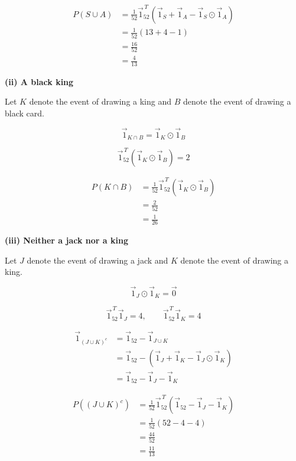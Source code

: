 \begin{enumerate}[label=\thesubsection.\arabic*, ref=\thesubsection.\theenumi]
\[
\begin{aligned}
P(S\cup A)
&=\frac{1}{52}\vec{1}_{52}^{\,T}
\left(
\vec{1}_S+\vec{1}_A-
\vec{1}_S\odot\vec{1}_A
\right)\\[6pt]
&=\frac{1}{52}(13+4-1)\\
&=\frac{16}{52}\\
&=\frac{4}{13}
\end{aligned}
\]

\par
\medskip
\noindent\textbf{(ii) A black king}
\par
\smallskip

Let $K$ denote the event of drawing a king and
$B$ denote the event of drawing a black card.

\[
\vec{1}_{K\cap B}
=
\vec{1}_K\odot\vec{1}_B
\]

\[
\vec{1}_{52}^{\,T}
(\vec{1}_K\odot\vec{1}_B)=2
\]

\[
\begin{aligned}
P(K\cap B)
&=\frac{1}{52}\vec{1}_{52}^{\,T}
(\vec{1}_K\odot\vec{1}_B)\\[6pt]
&=\frac{2}{52}\\
&=\frac{1}{26}
\end{aligned}
\]

\par
\medskip
\noindent\textbf{(iii) Neither a jack nor a king}
\par
\smallskip

Let $J$ denote the event of drawing a jack and
$K$ denote the event of drawing a king.

\[
\vec{1}_J\odot\vec{1}_K=\vec{0}
\]

\[
\vec{1}_{52}^{\,T}\vec{1}_J=4,
\qquad
\vec{1}_{52}^{\,T}\vec{1}_K=4
\]

\[
\begin{aligned}
\vec{1}_{(J\cup K)^c}
&=\vec{1}_{52}-\vec{1}_{J\cup K}\\
&=\vec{1}_{52}-
\left(
\vec{1}_J+\vec{1}_K-
\vec{1}_J\odot\vec{1}_K
\right)\\
&=\vec{1}_{52}-\vec{1}_J-\vec{1}_K
\end{aligned}
\]

\[
\begin{aligned}
P((J\cup K)^c)
&=\frac{1}{52}\vec{1}_{52}^{\,T}
(\vec{1}_{52}-\vec{1}_J-\vec{1}_K)\\[6pt]
&=\frac{1}{52}(52-4-4)\\
&=\frac{44}{52}\\
&=\frac{11}{13}
\end{aligned}
\]


\end{enumerate}

